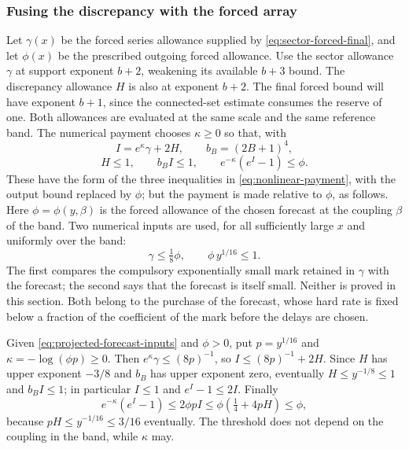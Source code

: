 \subsubsection{Fusing the discrepancy with the forced array}
Let $\gamma(x)$ be the forced series allowance supplied by
\eqref{eq:sector-forced-final}, and let $\phi(x)$ be the
prescribed outgoing forced allowance. Use the sector allowance
$\gamma$ at support exponent $b+2$, weakening its available
$b+3$ bound. The discrepancy allowance $H$ is also at exponent
$b+2$. The final forced bound will have exponent $b+1$, since
the connected-set estimate consumes the reserve of one. Both
allowances are evaluated at the
same scale and the same reference band. The numerical payment
chooses $\kappa\ge0$ so that, with
\[
             I=e^\kappa\gamma+2H,\qquad b_B=(2B+1)^4,
\]
\begin{equation}\label{eq:projected-fusion-payment}
               H\le1,\qquad b_BI\le1,
                              \qquad e^{-\kappa}(e^I-1)\le\phi.
\end{equation}
These have the form of the three inequalities in
\eqref{eq:nonlinear-payment}, with the output bound replaced by
$\phi$; but the payment is made relative to $\phi$, as follows.
Here $\phi=\phi(y,\beta)$ is the forced allowance of the chosen
forecast at the coupling $\beta$ of the band. Two numerical inputs
are used, for all sufficiently large $x$ and uniformly over the
band:
\begin{equation}\label{eq:projected-forecast-inputs}
            \gamma\le\tfrac18\phi,\qquad \phi\,y^{1/16}\le1 .
\end{equation}
The first compares the compulsory exponentially small mark retained
in $\gamma$ with the forecast; the second says that the forecast is
itself small. Neither is proved in this section. Both belong to the
purchase of the forecast, whose hard rate is fixed below a fraction
of the coefficient of the mark before the delays are chosen.

Given \eqref{eq:projected-forecast-inputs} and $\phi>0$, put
$p=y^{1/16}$ and $\kappa=-\log(\phi p)\ge0$. Then
$e^\kappa\gamma\le(8p)^{-1}$, so
$I\le(8p)^{-1}+2H$. Since $H$ has upper exponent $-3/8$ and $b_B$
has upper exponent zero, eventually $H\le y^{-1/8}\le1$ and
$b_BI\le1$; in particular $I\le1$ and $e^I-1\le2I$. Finally
\[
 e^{-\kappa}(e^I-1)\le2\phi pI\le\phi\left(\tfrac14+4pH\right)
                                              \le\phi,
\]
because $pH\le y^{-1/16}\le3/16$ eventually. The threshold does not
depend on the coupling in the band, while $\kappa$ may.

